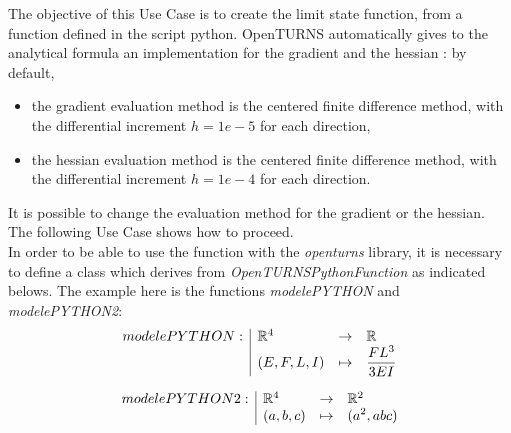 \renewcommand{\filename}{docUCLSF_PythonScript.tex}
\renewcommand{\filetitle}{UC : From a fonction defined in the script python}

\HeaderIIILevel

\label{OpenTURNSPythonFunction}



The objective of this Use Case is to create the limit state function, from a function defined in the script python. OpenTURNS automatically gives to the analytical formula an implementation for the gradient and the hessian : by default,
\begin{itemize}
\item the gradient evaluation method is the  centered finite difference method, with the differential increment $h=1e-5$ for each direction,
\item the hessian evaluation method is the  centered finite difference method, with the differential increment $h=1e-4$ for each direction.
\end{itemize}
It is possible to change the evaluation method for the gradient or the hessian. The following Use Case shows how to proceed.\\




In order to be able to use the function with the {\itshape openturns} library, it is necessary to define a class which derives from {\itshape OpenTURNSPythonFunction} as indicated belows. The example here is the functions {\itshape modelePYTHON} and {\itshape modelePYTHON2}:
\begin{equation}
  \begin{array}{l|lcl}
    modelePYTHON : & {\mathbb R}^4 & \rightarrow & {\mathbb R} \\
    & (E,F,L,I)    & \mapsto     & \displaystyle \frac{FL^3}{3EI}
  \end{array}
\end{equation}

\begin{equation}
  \begin{array}{l|lcl}
    modelePYTHON2 : & {\mathbb R}^4 & \rightarrow & {\mathbb R}^2 \\
    & (a,b,c)    & \mapsto     & \displaystyle (a^2, abc)
  \end{array}
\end{equation}


